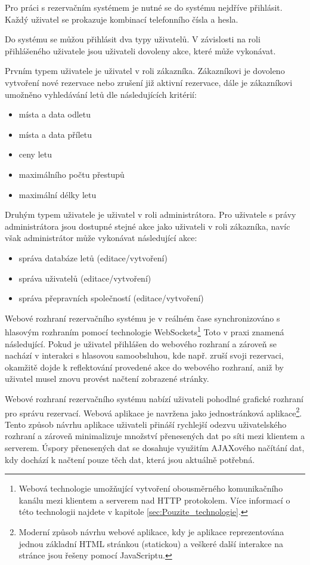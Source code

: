 \documentclass[ing,male,java,dept460,twoside]{diploma}						%
\begin{document}
Pro práci s rezervačním systémem je nutné se do systému nejdříve přihlásit. Každý uživatel se prokazuje kombinací telefonního čísla a hesla.

Do systému se můžou přihlásit dva typy uživatelů. V závislosti na roli přihlášeného uživatele jsou uživateli dovoleny akce, které může vykonávat.

Prvním typem uživatele je uživatel v roli zákazníka. Zákazníkovi je dovoleno vytvoření nové rezervace nebo zrušení již aktivní rezervace, dále je zákazníkovi umožněno vyhledávání letů dle následujících kritérií:

\begin{itemize}
\item místa a data odletu
\item místa a data příletu
\item ceny letu
\item maximálního počtu přestupů
\item maximální délky letu
\end{itemize}

Druhým typem uživatele je uživatel v roli administrátora. Pro uživatele s právy administrátora jsou dostupné stejné akce jako uživateli v roli zákazníka, navíc však administrátor může vykonávat následující akce:

\begin{itemize}
\item správa databáze letů (editace/vytvoření)
\item správa uživatelů (editace/vytvoření)
\item správa přepravních společností (editace/vytvoření)
\end{itemize}

Webové rozhraní rezervačního systému je v reálném čase synchronizováno s hlasovým rozhraním pomocí technologie WebSockets\footnote{Webová technologie umožňující vytvoření obousměrného komunikačního kanálu mezi klientem a serverem nad HTTP protokolem. Více informací o této technologii najdete v kapitole \ref{sec:Pouzite_technologie}.} Toto v praxi znamená následující. Pokud je uživatel přihlášen do webového rozhraní a zároveň se nachází v interakci s hlasovou samoobsluhou, kde např. zruší svoji rezervaci, okamžitě dojde k reflektování provedené akce do webového rozhraní, aniž by uživatel musel znovu provést načtení zobrazené stránky.

Webové rozhraní rezervačního systému nabízí uživateli pohodlné grafické rozhraní pro správu rezervací. Webová aplikace je navržena jako jednostránková aplikace\footnote{Moderní způsob návrhu webové aplikace, kdy je aplikace reprezentována jednou základní HTML stránkou (statickou) a veškeré další interakce na stránce jsou řešeny pomocí JavaScriptu.}. Tento způsob návrhu aplikace uživateli přináší rychlejší odezvu uživatelského rozhraní a zároveň minimalizuje množství přenesených dat po síti mezi klientem a serverem. Úspory přenesených dat se dosahuje využitím AJAXového načítání dat, kdy dochází k načtení pouze těch dat, která jsou aktuálně potřebná.
\end{document}
